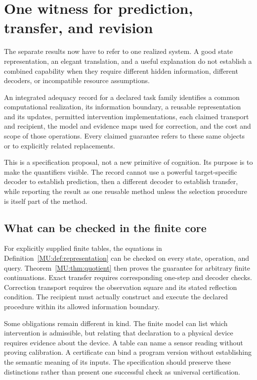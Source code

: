 \section{One witness for prediction, transfer, and revision}\label{MU:sec:witness}
The separate results now have to refer to one realized system. A good state representation, an elegant translation, and a useful explanation do not establish a combined capability when they require different hidden information, different decoders, or incompatible resource assumptions.

\begin{MUdefinition}\label{MU:def:witness}
An integrated adequacy record for a declared task family identifies a common computational realization, its information boundary, a reusable representation and its updates, permitted intervention implementations, each claimed transport and recipient, the model and evidence maps used for correction, and the cost and scope of those operations. Every claimed guarantee refers to these same objects or to explicitly related replacements.
\end{MUdefinition}
This is a specification proposal, not a new primitive of cognition. Its purpose is to make the quantifiers visible. The record cannot use a powerful target-specific decoder to establish prediction, then a different decoder to establish transfer, while reporting the result as one reusable method unless the selection procedure is itself part of the method.

\subsection{What can be checked in the finite core}
For explicitly supplied finite tables, the equations in Definition~\ref{MU:def:representation} can be checked on every state, operation, and query. Theorem~\ref{MU:thm:quotient} then proves the guarantee for arbitrary finite continuations. Exact transfer requires corresponding one-step and decoder checks. Correction transport requires the observation square and its stated reflection condition. The recipient must actually construct and execute the declared procedure within its allowed information boundary.

Some obligations remain different in kind. The finite model can list which intervention is admissible, but relating that declaration to a physical device requires evidence about the device. A table can name a sensor reading without proving calibration. A certificate can bind a program version without establishing the semantic meaning of its inputs. The specification should preserve these distinctions rather than present one successful check as universal certification.

